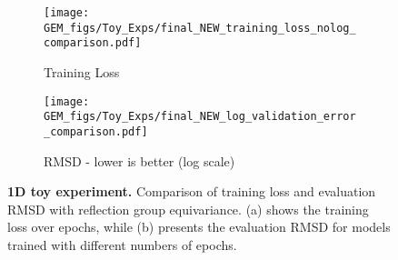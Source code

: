 \begin{figure}[H]
    \centering
    \begin{subfigure}[b]{0.33\textwidth} %
        \centering
        \texttt{[image: GEM\_figs/Toy\_Exps/final\_NEW\_training\_loss\_nolog\_comparison.pdf]}
        \caption{Training Loss}
        \label{fig:training_loss_nolog}
    \end{subfigure}
    \begin{subfigure}[b]{0.33\textwidth} %
        \centering
        \texttt{[image: GEM\_figs/Toy\_Exps/final\_NEW\_log\_validation\_error\_comparison.pdf]}
        \caption{RMSD - lower is better (log scale)}
        \label{fig:validation_error_log}
    \end{subfigure}
    \caption{\textbf{1D toy experiment.} Comparison of training loss and evaluation RMSD with reflection group equivariance. (a) shows the training loss over epochs, while (b) presents the evaluation RMSD for models trained with different numbers of epochs.}
    \label{fig:1D-toy}
\end{figure}